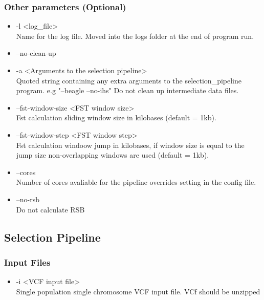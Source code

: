 \documentclass[a4paper,10pt]{article}
\begin{document}
                             \subsubsection{Other parameters (Optional)}
                             \begin{itemize}
                             \item -l <log\_file> \\
                             Name for the log file. Moved into the logs folder at the end of program run.
                             \item --no-clean-up\\ 
                             \item -a <Arguments to the selection pipeline>\\
                             Quoted string containing any extra arguments to the selection\_pipeline program. e.g "--beagle --no-ihs"
                             Do not clean up intermediate data files.
                             \item --fst-window-size <FST window size>\\
                             Fst calculation sliding window size in kilobases (default = 1kb).
                             \item --fst-window-step <FST window step>\\
                             Fst calculation windoow jump in kilobases, if window size is equal to
                             the jump size non-overlapping windows are used (default = 1kb).
                             \item --cores \\
                             Number of cores avaliable for the pipeline overrides setting in the config file.
                             \item --no-rsb \\
                             Do not calculate RSB
                             \end{itemize}
                             \subsection{Selection Pipeline}
                             \subsubsection{Input Files}
                             \begin{itemize}
                             \item -i <VCF input file>\\
                             Single population single chromosome VCF input file. VCf should be unzipped
                             \end{itemize}
\end{document}
